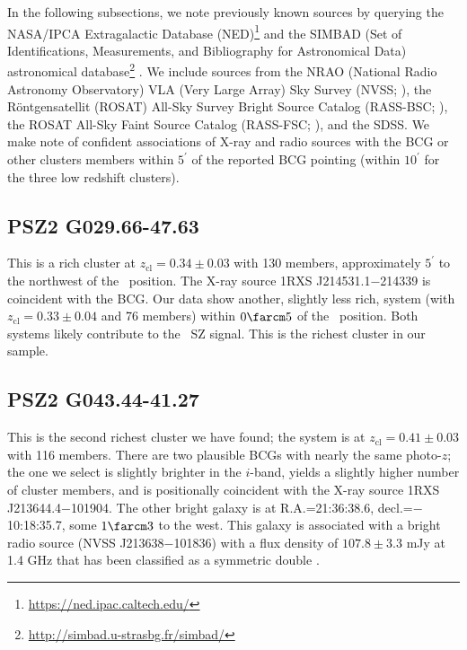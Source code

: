 \documentclass[apj, revtex4-1]{emulateapj}
\begin{document}
In the following subsections, we note previously known sources by querying the NASA/IPCA Extragalactic Database (NED)\footnote{\url{https://ned.ipac.caltech.edu/}} and the SIMBAD (Set of Identifications, Measurements, and Bibliography for Astronomical Data) astronomical database\footnote{\url{http://simbad.u-strasbg.fr/simbad/}} \citep{Wenger2000}. We include sources from the NRAO (National Radio Astronomy Observatory) VLA (Very Large Array) Sky Survey (NVSS; \citealt{Condon1998}), the R\"{o}ntgensatellit (ROSAT) All-Sky Survey Bright Source Catalog (RASS-BSC; \citealt{Voges1999a}), the ROSAT All-Sky Faint Source Catalog (RASS-FSC; \citealt{Voges2000}), and the SDSS. We make note of confident associations of X-ray and radio sources with the BCG or other clusters members within $5^\prime$ of the reported BCG pointing (within $10^\prime$ for the three low redshift clusters).

\subsection{PSZ2 G029.66-47.63} %
This is a rich cluster at $z_\mathrm{cl} = 0.34 \pm 0.03$ with 130 members, approximately $5^\prime$ to the northwest of the \planck\ position. The X-ray source 1RXS J214531.1$-$214339 is coincident with the BCG. Our data show another, slightly less rich, system (with $z_\mathrm{cl} = 0.33 \pm 0.04$ and 76 members) within $0\farcm5$ of the \planck\ position. Both systems likely contribute to the \planck\ SZ signal. This is the richest cluster in our sample.

\subsection{PSZ2 G043.44-41.27} %
This is the second richest cluster we have found; the system is at $z_\mathrm{cl} = 0.41 \pm 0.03$ with 116 members. There are two plausible BCGs with nearly the same photo-$z$; the one we select is slightly brighter in the $i$-band, yields a slightly higher number of cluster members, and is positionally coincident with the X-ray source 1RXS J213644.4$-$101904. The other bright galaxy is at R.A.=21:36:38.6, decl.=$-$10:18:35.7, some $1\farcm3$ to the west. This galaxy is associated with a bright radio source (NVSS J213638$-$101836) with a flux density of $107.8 \pm 3.3$ mJy at 1.4 GHz that has been classified as a symmetric double \citep{Douglas1996}.
\end{document}
